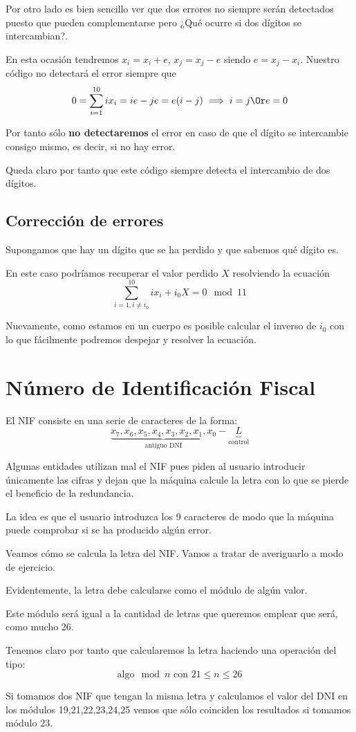 Por otro lado es bien sencillo ver que dos errores no siempre serán detectados puesto que pueden complementarse pero ¿Qué ocurre si dos dígitos se intercambian?.

En esta ocasión tendremos $x_i=x_i+e$, $x_j=x_j-e$ siendo $e=x_j-x_i$. Nuestro código no detectará el error siempre que
\[0 = \sum_{i=1}^{10}ix_i = ie-je = e(i-j) \implies i=j \Or e=0\]

Por tanto sólo \textbf{no detectaremos} el error en caso de que el dígito se intercambie consigo mismo, es decir, si no hay error.

Queda claro por tanto que este código siempre detecta el intercambio de dos dígitos.

\subsection{Corrección de errores}
Supongamos que hay un dígito que se ha perdido y que sabemos qué dígito es.

En este caso podríamos recuperar el valor perdido $X$ resolviendo la ecuación
\[\sum_{i=1, i\neq i_0}^{10}ix_i + i_0X = 0 \mod 11\]

Nuevamente, como estamos en un cuerpo es posible calcular el inverso de $i_0$ con lo que fácilmente podremos despejar y resolver la ecuación.


\section{Número de Identificación Fiscal}
El NIF consiste en una serie de caracteres de la forma:
\[\underbrace{x_7,x_6,x_5,x_4,x_3,x_2,x_1,x_0}_{\text{antiguo DNI}}-\underbrace{L}_{\text{control}}\]

Algunas entidades utilizan mal el NIF pues piden al usuario introducir únicamente las cifras y dejan que la máquina calcule la letra con lo que se pierde el beneficio de la redundancia.

La idea es que el usuario introduzca los 9 caracteres de modo que la máquina puede comprobar si se ha producido algún error.

Veamos cómo se calcula la letra del NIF. Vamos a tratar de averiguarlo a modo de ejercicio.
\begin{example}
Evidentemente, la letra debe calcularse como el módulo de algún valor.

Este módulo será igual a la cantidad de letras que queremos emplear que será, como mucho 26.

Tenemos claro por tanto que calcularemos la letra haciendo una operación del tipo:
\[\text{algo} \mod n \text{ con } 21 \leq n \leq 26\]

Si tomamos dos NIF que tengan la misma letra y calculamos el valor del DNI en los módulos 19,21,22,23,24,25 vemos que sólo coinciden los resultados si tomamos módulo 23.

\end{example}

